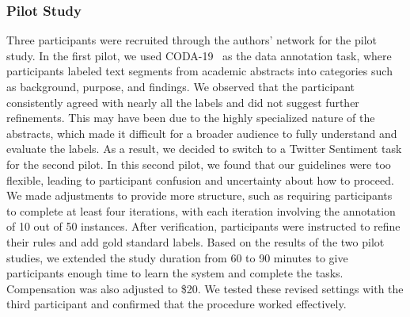 

\subsubsection{Pilot Study\label{sec:pilot-study}}
Three participants were recruited through the authors' network for the pilot study. 
In the first pilot, we used CODA-19~\cite{huang-etal-2020-coda} as the data annotation task, where participants labeled text segments from academic abstracts into categories such as background, purpose, and findings.
We observed that the participant consistently agreed with nearly all the labels and did not suggest further refinements. 
This may have been due to the highly specialized nature of the abstracts, which made it difficult for a broader audience to fully understand and evaluate the labels. 
As a result, we decided to switch to a Twitter Sentiment task for the second pilot.
In this second pilot, we found that our guidelines were too flexible, leading to participant confusion and uncertainty about how to proceed. 
We made adjustments to provide more structure, such as requiring participants to complete at least four iterations, with each iteration involving the annotation of 10 out of 50 instances. 
After verification, participants were instructed to refine their rules and add gold standard labels.
Based on the results of the two pilot studies, we extended the study duration from 60 to 90 minutes to give participants enough time to learn the system and complete the tasks. Compensation was also adjusted to \$20. 
We tested these revised settings with the third participant and confirmed that the procedure worked effectively.

